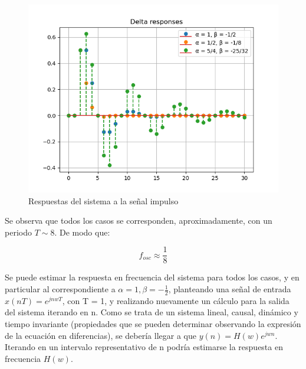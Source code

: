 \begin{figure}[H]
    \centering 
    \includegraphics [scale=0.6]{images/ej9_all_delta.png} 
    \caption{Respuestas del sistema a la señal impulso}
\end{figure}

Se observa que todos los casos se corresponden, aproximadamente, con un periodo $T \sim 8$. De modo que:

$$f_{osc} \approx \frac{1}{8}$$

Se puede estimar la respuesta en frecuencia del sistema para todos los casos, y en particular al correspondiente a $\alpha  = 1, \beta = -\frac{1}{2}$, planteando
una señal de entrada $x(nT) = e^{jnwT}$, con T = 1, y realizando nuevamente un cálculo para la salida del sistema iterando en n. Como se trata de un sistema lineal, causal, dinámico y tiempo invariante 
(propiedades que se pueden determinar observando la expresión de la ecuación en diferencias), se debería llegar a que $y(n) =  H(w)e^{jwn}$. Iterando en un intervalo representativo de n podría estimarse la respuesta en frecuencia $H(w)$.


